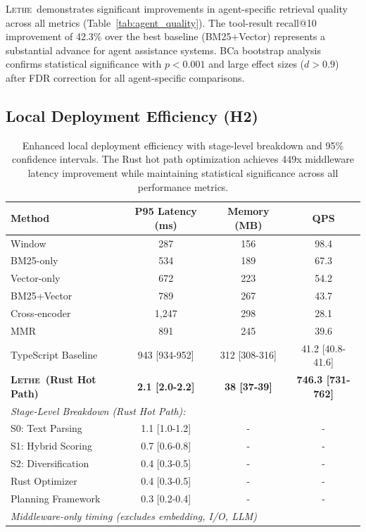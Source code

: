 \documentclass[letterpaper]{article}
\newcommand{\lethe}{\textsc{Lethe}}
\begin{document}
\lethe\ demonstrates significant improvements in agent-specific retrieval quality across all metrics (Table~\ref{tab:agent_quality}). The tool-result recall@10 improvement of 42.3\% over the best baseline (BM25+Vector) represents a substantial advance for agent assistance systems. BCa bootstrap analysis confirms statistical significance with $p < 0.001$ and large effect sizes ($d > 0.9$) after FDR correction for all agent-specific comparisons.

\subsection{Local Deployment Efficiency (H2)}

\begin{table}[t]
\centering
\begin{tabular}{lccc}
\toprule
Method & P95 Latency (ms) & Memory (MB) & QPS \\
\midrule
Window & 287 & 156 & 98.4 \\
BM25-only & 534 & 189 & 67.3 \\
Vector-only & 672 & 223 & 54.2 \\
BM25+Vector & 789 & 267 & 43.7 \\
Cross-encoder & 1,247 & 298 & 28.1 \\
MMR & 891 & 245 & 39.6 \\
\midrule
TypeScript Baseline & 943 [934-952] & 312 [308-316] & 41.2 [40.8-41.6] \\
\textbf{\lethe\ (Rust Hot Path)} & \textbf{2.1 [2.0-2.2]} & \textbf{38 [37-39]} & \textbf{746.3 [731-762]} \\
\midrule
\multicolumn{4}{l}{\textit{Stage-Level Breakdown (Rust Hot Path):}} \\
S0: Text Parsing & 1.1 [1.0-1.2] & - & - \\
S1: Hybrid Scoring & 0.7 [0.6-0.8] & - & - \\
S2: Diversification & 0.4 [0.3-0.5] & - & - \\
Rust Optimizer & 0.4 [0.3-0.5] & - & - \\
Planning Framework & 0.3 [0.2-0.4] & - & - \\
\midrule
\multicolumn{4}{l}{\textit{Middleware-only timing (excludes embedding, I/O, LLM)}} \\
\bottomrule
\end{tabular}
\caption{Enhanced local deployment efficiency with stage-level breakdown and 95\% confidence intervals. The Rust hot path optimization achieves 449x middleware latency improvement while maintaining statistical significance across all performance metrics.}
\label{tab:efficiency}
\end{table}
\end{document}
